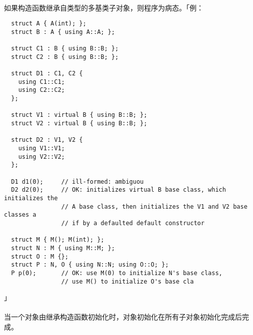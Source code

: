 \paragraph{}
如果构造函数继承自类型的多基类子对象，则程序为病态。「例：
\begin{lstlisting}
  struct A { A(int); };
  struct B : A { using A::A; };

  struct C1 : B { using B::B; };
  struct C2 : B { using B::B; };

  struct D1 : C1, C2 {
    using C1::C1;
    using C2::C2;
  };

  struct V1 : virtual B { using B::B; };
  struct V2 : virtual B { using B::B; };

  struct D2 : V1, V2 {
    using V1::V1;
    using V2::V2;
  };

  D1 d1(0);     // ill-formed: ambiguou
  D2 d2(0);     // OK: initializes virtual B base class, which initializes the
                // A base class, then initializes the V1 and V2 base classes a
                // if by a defaulted default constructor

  struct M { M(); M(int); };
  struct N : M { using M::M; };
  struct O : M {};
  struct P : N, O { using N::N; using O::O; };
  P p(0);       // OK: use M(0) to initialize N's base class,
                // use M() to initialize O's base cla
\end{lstlisting}」

\paragraph{}
当一个对象由继承构造函数初始化时，对象初始化在所有子对象初始化完成后完成。


